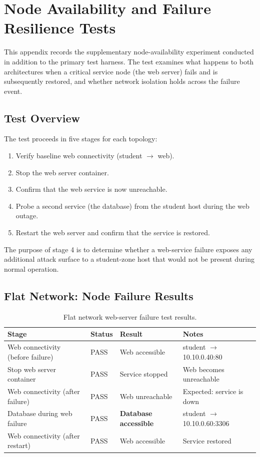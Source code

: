\chapter{Node Availability and Failure Resilience Tests}
\label{ch:appendix-node}

This appendix records the supplementary node-availability experiment conducted in addition to the primary test harness. The test examines what happens to both architectures when a critical service node (the web server) fails and is subsequently restored, and whether network isolation holds across the failure event.

\section{Test Overview}

The test proceeds in five stages for each topology:
\begin{enumerate}[leftmargin=*]
    \item Verify baseline web connectivity (student $\rightarrow$ web).
    \item Stop the web server container.
    \item Confirm that the web service is now unreachable.
    \item Probe a second service (the database) from the student host during the web outage.
    \item Restart the web server and confirm that the service is restored.
\end{enumerate}

The purpose of stage 4 is to determine whether a web-service failure exposes any additional attack surface to a student-zone host that would not be present during normal operation.

\section{Flat Network: Node Failure Results}

\begin{table}[H]
\centering
\caption[Flat network node failure results]{Flat network web-server failure test results.}
\label{tab:node-flat}
\begin{tabularx}{\textwidth}{l l X X}
\toprule
\textbf{Stage} & \textbf{Status} & \textbf{Result} & \textbf{Notes} \\
\midrule
Web connectivity (before failure) & PASS & Web accessible & student $\rightarrow$ 10.10.0.40:80 \\
Stop web server container & PASS & Service stopped & Web becomes unreachable \\
Web connectivity (after failure) & PASS & Web unreachable & Expected: service is down \\
Database during web failure & PASS & \textbf{Database accessible} & student $\rightarrow$ 10.10.0.60:3306 \\
Web connectivity (after restart) & PASS & Web accessible & Service restored \\
\bottomrule
\end{tabularx}
\end{table}

